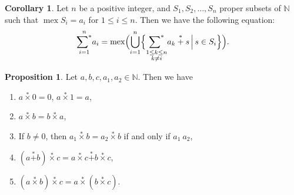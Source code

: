 \documentclass[a4paper,11pt]{amsart}
\theoremstyle{definition}
\newtheorem{prop}{Proposition}[section]
\newtheorem{cor}{Corollary}[section]
\newcommand{\mex}{\operatorname{mex}}
\newcommand{\nimadd}{\overset{*}{+}}
\newcommand{\nimsum}{{\sum}^{*}}
\newcommand{\nimmul}{\overset{*}{\times}}
\numberwithin{equation}{section}
\def\Non{\mathbb{N}}
\begin{document}
\begin{cor}\label{cor:NIM_add_and_mex}
	Let $n$ be a positive integer, and
	$S_{1}, S_{2}, \ldots , S_{n}$ proper subsets of $\Non$
	such that $\mex S_{i}=a_{i}$ for $1\leq i\leq n$.
	Then we have the following equation:
	\begin{equation}\label{eq:NIM_add_and_mex_multi}
		\overset{n}{\underset{i=1}{\nimsum}} a_{i}
		=
		\mex\Bigl(
			\bigcup\limits_{i=1}^{n}
			\Bigl\{
				\underset{
					\substack{
						1 \leq k \leq n	\\
						k \neq i
					}
				}{
				\nimsum
				}
				a_{k}
				\nimadd s
			\, \Big| \,
				s \in {S}_{i}
			\Bigr\}
		\Bigr)
		.
	\end{equation}
\end{cor}
%
%
%
%
\begin{prop}
%
Let $a,b,c,a_{1},a_{2}\in\Non$.
Then we have
%
\begin{enumerate}[label=(\roman*)] %
%
\item
$a\nimmul 0=0$, $a\nimmul 1=a$,
%
\item
$a \nimmul b=b \nimmul a$,
%
\item
If $b\neq0$, then $a_{1} \nimmul b=a_{2} \nimmul b$ if and only if $a_{1}~a_{2}$,
%
\item
$(a \nimadd b) \nimmul c = a \nimmul c \nimadd b \nimmul c$,
%
\item
$(a \nimmul b) \nimmul c = a \nimmul (b \nimmul c)$.
%
\end{enumerate} %
%
\end{prop}
%
%
%
%
%
%
\end{document}
